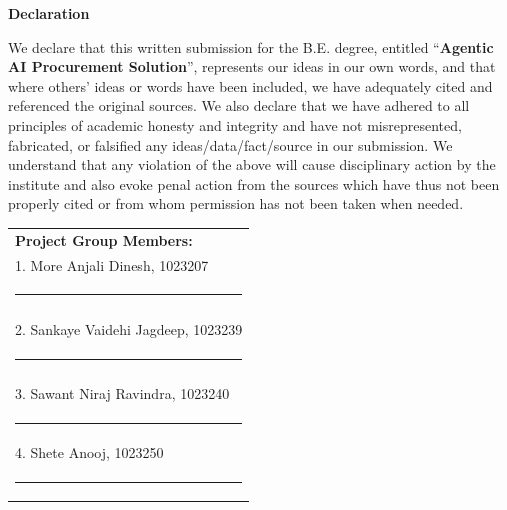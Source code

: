 
\begin{centering}
\large
{\LARGE\bf Declaration}\\
\end{centering}

\justify
We declare that this written submission for the B.E. degree, entitled
``{\bf Agentic AI Procurement Solution}'', represents our ideas in our own words, and that where others' ideas or words have been included, we have adequately cited and referenced the original sources. We also declare that we have adhered to all principles of academic honesty and integrity and have not misrepresented, fabricated, or falsified any ideas/data/fact/source in our submission. We understand that any violation of the above will cause disciplinary action by the institute and also evoke penal action from the sources which have thus not been properly cited or from whom permission has not been taken when needed.  \\ 

\vspace{3cm}
\hfill%
\begin{tabular}[t]{l@{}}
\vspace{1cm}

{\textbf{Project Group Members:}} \\ 
\vspace{1cm}

1. More Anjali Dinesh, 1023207 \\
\noindent\rule{5cm}{0.10pt} \\
\\
\vspace{1cm}

2. Sankaye Vaidehi Jagdeep, 1023239 \\
\noindent\rule{5cm}{0.10pt} \\
\\
\vspace{1cm}

3. Sawant Niraj Ravindra, 1023240 \\
 \noindent\rule{5cm}{0.10pt}
\\
\vspace{1cm}


4. Shete Anooj, 1023250 \\
 \noindent\rule{5cm}{0.10pt}

\end{tabular}



